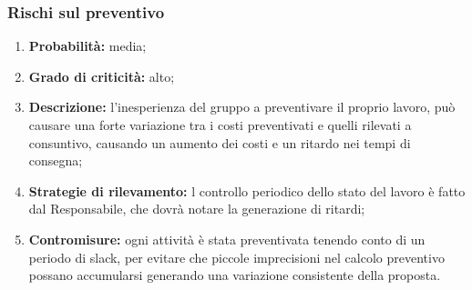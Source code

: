 \subsubsection{Rischi sul preventivo}
\begin{enumerate}
	\item \textbf{Probabilità:} media;
	\item \textbf{Grado di criticità:} alto;
	\item \textbf{Descrizione:} l’inesperienza del gruppo a preventivare il proprio lavoro, può causare una forte variazione tra i costi preventivati e quelli rilevati a consuntivo, causando un aumento dei costi e un ritardo nei tempi di consegna;
	\item \textbf{Strategie di rilevamento:} l controllo periodico dello stato del lavoro è fatto dal Responsabile, che dovrà notare la generazione di ritardi;
	\item \textbf{Contromisure:} ogni attività è stata preventivata tenendo conto di un periodo di slack, per evitare che piccole imprecisioni nel calcolo preventivo possano accumularsi generando una variazione consistente della proposta.
\end{enumerate}


